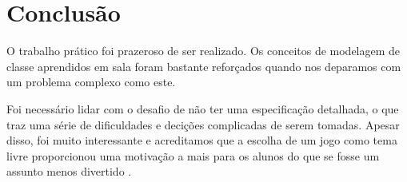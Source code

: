\documentclass[12pt]{article}
\begin{document}
\section{Conclusão}
\label{conclusao}

O trabalho prático foi prazeroso de ser realizado. Os conceitos de modelagem de classe aprendidos em sala foram bastante reforçados quando nos deparamos com um problema complexo como este.

Foi necessário lidar com o desafio de não ter uma especificação detalhada, o que traz uma série de dificuldades e decições complicadas de serem tomadas. Apesar disso, foi muito interessante e acreditamos que a escolha de um jogo como tema livre proporcionou uma motivação a mais para os alunos do que se fosse um assunto menos divertido \cite{forum}. 



\end{document}
